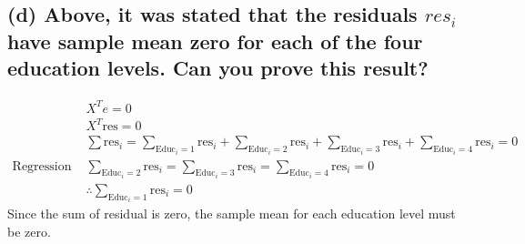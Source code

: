 \documentclass[12pt, a4paper]{article}
\begin{document}
\subsection*{(d) Above, it was stated that the residuals $res_i$ have sample mean zero for each of the four education levels. Can you prove this result?}
\begin{align*}
    &X^Te = 0\\
    &X^T\text{res} = 0\\
    &\sum \text{res}_i = \sum_{\text{Educ}_i = 1} \text{res}_i + \sum_{\text{Educ}_i = 2} \text{res}_i+ \sum_{\text{Educ}_i = 3} \text{res}_i+ \sum_{\text{Educ}_i = 4} \text{res}_i = 0\\
    \text{Regression property }& \sum_{\text{Educ}_i = 2} \text{res}_i= \sum_{\text{Educ}_i = 3} \text{res}_i= \sum_{\text{Educ}_i = 4} \text{res}_i = 0\\
    &\therefore \sum_{\text{Educ}_i = 1} \text{res}_i = 0
\end{align*}
Since the sum of residual is zero, the sample mean for each education level must be zero.
\vspace{1em}
\end{document}

